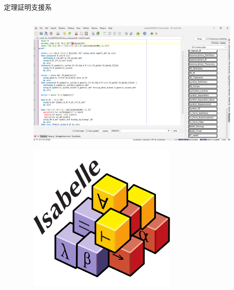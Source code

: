 \documentclass[17pt,aspectratio=169]{beamer}
\begin{document}
\begin{frame}{定理証明支援系}
\begin{columns}
\begin{column}{0.65\textwidth}
        \end{column}
        \begin{column}{0.35\textwidth}
            \begin{figure}
                \includegraphics[width=1.0\linewidth]{./images/isabelle_editor.png}
            \end{figure}
            \vspace{-10pt}
            \begin{figure}
                \includegraphics[width=0.7\linewidth]{./images/isabelle_logo.png}
            \end{figure}

        \end{column}
    \end{columns}


\end{frame}
\end{document}
